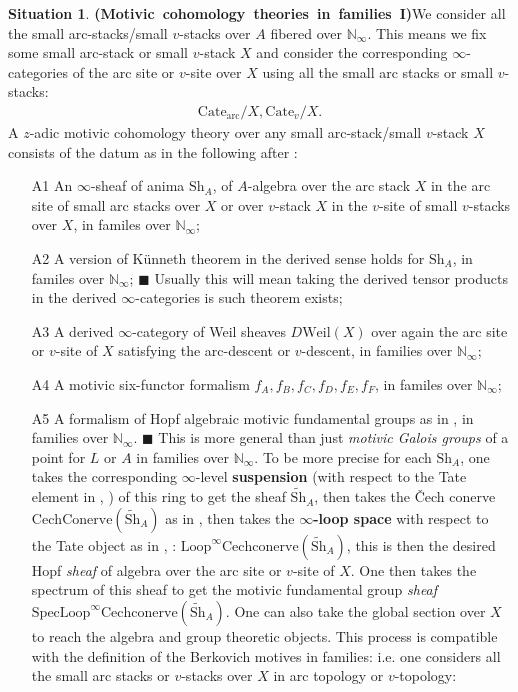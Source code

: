 \documentclass[12pt]{article}
\theoremstyle{definition}
\newtheorem{situation}{Situation}
\begin{document}
\begin{situation}\mbox{\textbf{(Motivic cohomology theories in families I)}}\label{situation1}
We consider all the small arc-stacks/small $v$-stacks over $A$ fibered over $\mathbb{N}_\infty$. This means we fix some small arc-stack or small $v$-stack $X$ and consider the corresponding $\infty$-categories of the arc site or $v$-site over $X$ using all the small arc stacks or small $v$-stacks:
\begin{align}
\mathrm{Cate}_\mathrm{arc}/X,\mathrm{Cate}_v/X.
\end{align}
A $z$-adic motivic cohomology theory over any small arc-stack/small $v$-stack $X$ consists of the datum as in the following after \cite{3A}:
\begin{itemize}
\item[A1] An $\infty$-sheaf of anima $\mathrm{Sh}_A$, of $A$-algebra over the arc stack $X$ in the arc site of small arc stacks over $X$ or over $v$-stack $X$ in the $v$-site of small $v$-stacks over $X$, in familes over $\mathbb{N}_\infty$;
\item[A2] A version of K\"unneth theorem in the derived sense holds for $\mathrm{Sh}_A$, in familes over $\mathbb{N}_\infty$;
\subitem $\blacksquare$ Usually this will mean taking the derived tensor products in the derived $\infty$-categories is such theorem exists; 
\item[A3] A derived $\infty$-category of Weil sheaves $D\mathrm{Weil}(X)$ over again the arc site or $v$-site of $X$ satisfying the arc-descent or $v$-descent, in families over $\mathbb{N}_\infty$;
\item[A4] A motivic six-functor formalism $f_A,f_B,f_C,f_D,f_E,f_F$, in familes over $\mathbb{N}_\infty$;
\item[A5] A formalism of Hopf algebraic motivic fundamental groups as in \cite[4.7]{3A}, in families over $\mathbb{N}_\infty$.
\subitem $\blacksquare$ This is more general than just \textit{motivic Galois groups} of a point for $L$ or $A$ in families over $\mathbb{N}_\infty$. To be more precise for each $\mathrm{Sh}_A$, one takes the corresponding $\infty$-level \textbf{suspension} (with respect to the Tate element in \cite{3A}, \cite{3S}) of this ring to get the sheaf $\widetilde{\mathrm{Sh}}_A$, then takes the \v{C}ech conerve $\mathrm{CechConerve}(\widetilde{\mathrm{Sh}}_A)$ as in \cite[4.9]{3A}, then takes the \textbf{$\infty$-loop space} with respect to the Tate object as in \cite{3A}, \cite{3S}: $\mathrm{Loop}^\infty\mathrm{Cechconerve}(\widetilde{\mathrm{Sh}}_A)$, this is then the desired Hopf \textit{sheaf} of algebra over the arc site or $v$-site of $X$. One then takes the spectrum of this sheaf to get the motivic fundamental group \textit{sheaf} $\mathrm{Spec}\mathrm{Loop}^\infty\mathrm{Cechconerve}(\widetilde{\mathrm{Sh}}_A)$. One can also take the global section over $X$ to reach the algebra and group theoretic objects. This process is compatible with the definition of the Berkovich motives in families: i.e. one considers all the small arc stacks or $v$-stacks over $X$ in arc topology or $v$-topology:

\end{itemize}
\end{situation}
\end{document}
